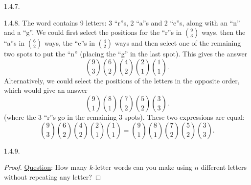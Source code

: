 \begin {itemize}
\begin{ans}{1.4.7.}
	
\end{ans}
\begin{ans}{1.4.8.}
		The word contains 9 letters: 3 ``r''s, 2 ``a''s and 2 ``e''s, along with an ``n'' and a ``g''.  We could first select the positions for the ``r''s in ${9 \choose 3}$ ways, then the ``a''s in ${6 \choose 2}$ ways, the ``e''s in ${4 \choose 2}$ ways and then select one of the remaining two spots to put the ``n'' (placing the ``g'' in the last spot).  This gives the answer
		\[{9 \choose 3}{6 \choose 2}{4 \choose 2}{2\choose 1}{1\choose 1}.\]
		Alternatively, we could select the positions of the letters in the opposite order, which would give an answer
		\[{9 \choose 1}{8\choose 1}{7 \choose 2}{5\choose 2}{3\choose 3}.\]
		(where the 3 ``r''s go in the remaining 3 spots).  These two expressions are equal:
		\[{9 \choose 3}{6 \choose 2}{4 \choose 2}{2\choose 1}{1\choose 1} = {9 \choose 1}{8\choose 1}{7 \choose 2}{5\choose 2}{3\choose 3}.\]
	
\end{ans}
\begin{ans}{1.4.9.}
		\begin{proof}
         \underline{Question}: How many $k$-letter words can you make using $n$ different letters without repeating any letter?


\end{proof}
\end{ans}
\end{itemize}
